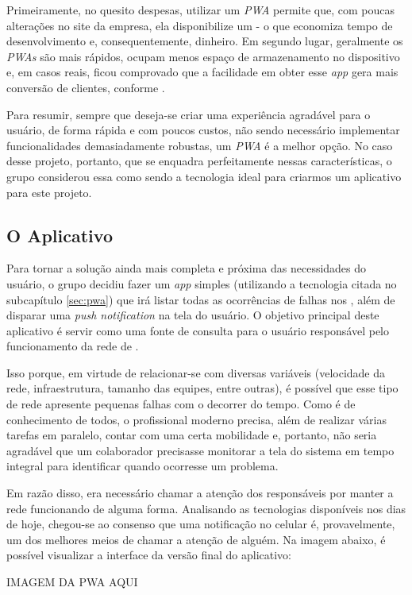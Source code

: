 Primeiramente, no quesito despesas, utilizar um \textit{PWA} permite que, com poucas alterações no site da empresa, ela disponibilize um  - o que economiza tempo de desenvolvimento e, consequentemente, dinheiro. Em segundo lugar, geralmente os \textit{PWAs} são mais rápidos, ocupam menos espaço de armazenamento no dispositivo e, em casos reais, ficou comprovado que a facilidade em obter esse \textit{app} gera mais conversão de clientes, conforme \cite{Souza19} .

Para resumir, sempre que deseja-se criar uma experiência agradável para o usuário, de forma rápida e com poucos custos, não sendo necessário implementar funcionalidades demasiadamente robustas, um \textit{PWA} é a melhor opção. No caso desse projeto, portanto, que se enquadra perfeitamente nessas características, o grupo considerou essa como sendo a tecnologia ideal para criarmos um aplicativo para este projeto.


\subsection{O Aplicativo}
\label{sec:aplicativo_de_alertas_pwa}

Para tornar a solução ainda mais completa e próxima das necessidades do usuário, o grupo decidiu fazer um \textit{app} simples (utilizando a tecnologia citada no subcapítulo \ref{sec:pwa}) que irá listar todas as ocorrências de falhas nos \containers{}, além de disparar uma \textit{push notification} na tela do usuário. O objetivo principal deste aplicativo é servir como uma fonte de consulta para o usuário responsável pelo funcionamento da rede de \containers{}.

Isso porque, em virtude de relacionar-se com diversas variáveis (velocidade da rede, infraestrutura, tamanho das equipes, entre outras), é possível que esse tipo de rede apresente pequenas falhas com o decorrer do tempo. Como é de conhecimento de todos, o profissional moderno precisa, além de realizar várias tarefas em paralelo, contar com uma certa mobilidade e, portanto, não seria agradável que um colaborador precisasse monitorar a tela do sistema em tempo integral para identificar quando ocorresse um problema.

Em razão disso, era necessário chamar a atenção dos responsáveis por manter a rede funcionando de alguma forma. Analisando as tecnologias disponíveis nos dias de hoje, chegou-se ao consenso que uma notificação no celular é, provavelmente, um dos melhores meios de chamar a atenção de alguém. Na imagem abaixo, é possível visualizar a interface da versão final do aplicativo:

{\huge IMAGEM DA PWA AQUI}